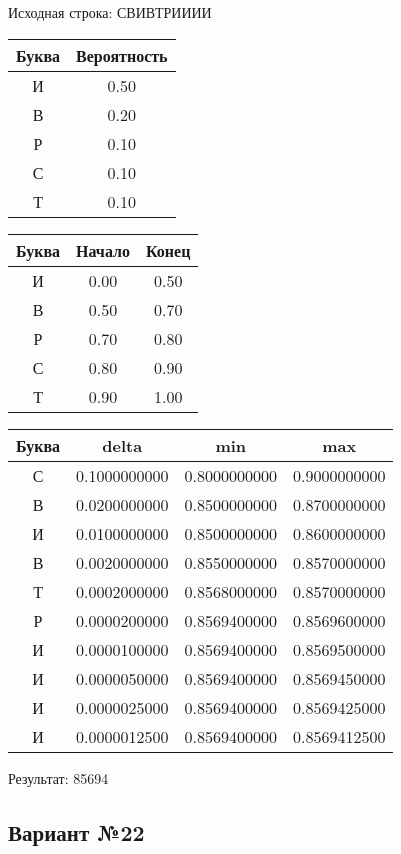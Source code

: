 \documentclass[a4paper, 12pt]{article}
\begin{document}
Исходная строка: СВИВТРИИИИ\
\begin{center}
 \begin{tabular}{ |c|c| } 
  \hline
     Буква & Вероятность \\ \hline
И & 0.50\\\hline
В & 0.20\\\hline
Р & 0.10\\\hline
С & 0.10\\\hline
Т & 0.10
\\ \hline \end{tabular}
\end{center}
\begin{center}
 \begin{tabular}{ |c|c|c| } 
  \hline
     Буква & Начало & Конец \\ \hline
И & 0.00 & 0.50\\\hline
В & 0.50 & 0.70\\\hline
Р & 0.70 & 0.80\\\hline
С & 0.80 & 0.90\\\hline
Т & 0.90 & 1.00
\\ \hline \end{tabular}
\end{center}
\begin{center}
 \begin{tabular}{ |c|c|c|c| } 
  \hline
     Буква & delta & min & max \\ \hline
С & 0.1000000000 & 0.8000000000 & 0.9000000000\\\hline
В & 0.0200000000 & 0.8500000000 & 0.8700000000\\\hline
И & 0.0100000000 & 0.8500000000 & 0.8600000000\\\hline
В & 0.0020000000 & 0.8550000000 & 0.8570000000\\\hline
Т & 0.0002000000 & 0.8568000000 & 0.8570000000\\\hline
Р & 0.0000200000 & 0.8569400000 & 0.8569600000\\\hline
И & 0.0000100000 & 0.8569400000 & 0.8569500000\\\hline
И & 0.0000050000 & 0.8569400000 & 0.8569450000\\\hline
И & 0.0000025000 & 0.8569400000 & 0.8569425000\\\hline
И & 0.0000012500 & 0.8569400000 & 0.8569412500
\\ \hline \end{tabular}
\end{center}
Результат: 85694
\pagebreak
\subsection{Вариант №22}
\end{document}

